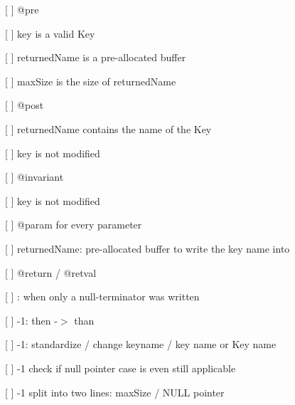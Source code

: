 \begin{DoxyItemize}
\begin{DoxyItemize}
\end{DoxyItemize}
\item \mbox{[} \mbox{]} {\ttfamily @pre}
\begin{DoxyItemize}
\item \mbox{[} \mbox{]} {\ttfamily key} is a valid Key
\item \mbox{[} \mbox{]} {\ttfamily returned\+Name} is a pre-\/allocated buffer
\item \mbox{[} \mbox{]} max\+Size is the size of {\ttfamily returned\+Name}
\end{DoxyItemize}
\item \mbox{[} \mbox{]} {\ttfamily @post}
\begin{DoxyItemize}
\item \mbox{[} \mbox{]} {\ttfamily returned\+Name} contains the name of the Key
\item \mbox{[} \mbox{]} {\ttfamily key} is not modified
\end{DoxyItemize}
\item \mbox{[} \mbox{]} {\ttfamily @invariant}
\begin{DoxyItemize}
\item \mbox{[} \mbox{]} {\ttfamily key} is not modified
\end{DoxyItemize}
\item \mbox{[} \mbox{]} {\ttfamily @param} for every parameter
\begin{DoxyItemize}
\item \mbox{[} \mbox{]} {\ttfamily returned\+Name}\+: pre-\/allocated buffer to write the key name into
\end{DoxyItemize}
\item \mbox{[} \mbox{]} {\ttfamily @return} / {\ttfamily @retval}
\begin{DoxyItemize}
\item \mbox{[} \mbox{]} {}\+: when only a null-\/terminator was written
\item \mbox{[} \mbox{]} {\ttfamily -\/1}\+: then -\/$>$ than
\item \mbox{[} \mbox{]} {\ttfamily -\/1}\+: standardize / change \textquotesingle{}keyname\textquotesingle{} / \textquotesingle{}key name\textquotesingle{} or \textquotesingle{}Key name\textquotesingle{}
\item \mbox{[} \mbox{]} {\ttfamily -\/1} check if null pointer case is even still applicable
\item \mbox{[} \mbox{]} {\ttfamily -\/1} split into two lines\+: max\+Size / N\+U\+LL pointer
\end{DoxyItemize}

\end{DoxyItemize}
